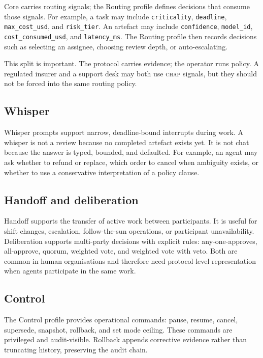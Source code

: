 \documentclass[11pt]{article}
\newcommand{\chap}{\textsc{chap}}
\begin{document}
Core carries routing signals; the Routing profile defines decisions that consume those signals. For example, a task may include \texttt{criticality}, \texttt{deadline}, \texttt{max\_cost\_usd}, and \texttt{risk\_tier}. An artefact may include \texttt{confidence}, \texttt{model\_id}, \texttt{cost\_consumed\_usd}, and \texttt{latency\_ms}. The Routing profile then records decisions such as selecting an assignee, choosing review depth, or auto-escalating.

This split is important. The protocol carries evidence; the operator runs policy. A regulated insurer and a support desk may both use \chap{} signals, but they should not be forced into the same routing policy.

\subsection{Whisper}

Whisper prompts support narrow, deadline-bound interrupts during work. A whisper is not a review because no completed artefact exists yet. It is not chat because the answer is typed, bounded, and defaulted. For example, an agent may ask whether to refund or replace, which order to cancel when ambiguity exists, or whether to use a conservative interpretation of a policy clause.

\subsection{Handoff and deliberation}

Handoff supports the transfer of active work between participants. It is useful for shift changes, escalation, follow-the-sun operations, or participant unavailability. Deliberation supports multi-party decisions with explicit rules: any-one-approves, all-approve, quorum, weighted vote, and weighted vote with veto. Both are common in human organisations and therefore need protocol-level representation when agents participate in the same work.

\subsection{Control}

The Control profile provides operational commands: pause, resume, cancel, supersede, snapshot, rollback, and set mode ceiling. These commands are privileged and audit-visible. Rollback appends corrective evidence rather than truncating history, preserving the audit chain.
\end{document}
